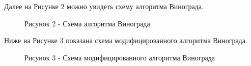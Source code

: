 \documentclass[12pt]{report}
\begin{document}
	\newpage
	Далее на Рисунке 2 можно увидеть схему алгоритма Винограда.
	\begin{figure}[h!]
		\caption*{Рисунок 2 - Схема алгоритма Винограда}
	\end{figure}
	
	
	\newpage
	Ниже на Рисунке 3 показана схема модифицированного алгоритма Винограда.
		\begin{figure}[h!]
		\caption*{Рисунок 3 - Схема модифицированного алгоритма Винограда}
	\end{figure}
\end{document}
